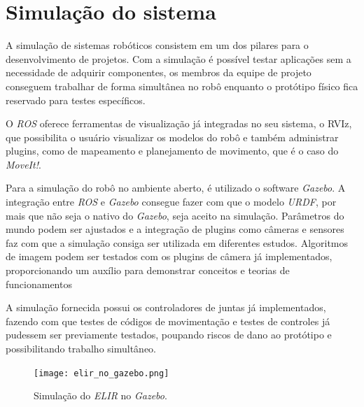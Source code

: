 \section{Simulação do sistema}
\label{sec:sim}
A simulação de sistemas robóticos consistem em um dos pilares para o desenvolvimento de projetos. Com a simulação é possível testar aplicações sem a necessidade de adquirir componentes, os membros da equipe de projeto conseguem trabalhar de forma simultânea no robô enquanto o protótipo físico fica reservado para testes específicos.

O \textit{ROS} oferece ferramentas de visualização já integradas no seu sistema, o RVIz, que possibilita o usuário visualizar os modelos do robô e também administrar plugins, como de mapeamento e planejamento de movimento, que é o caso do \textit{MoveIt!}.



Para a simulação do robô no ambiente aberto, é utilizado  o software \textit{Gazebo}. A integração entre \textit{ROS} e \textit{Gazebo} consegue fazer com que o modelo \textit{URDF}, por mais que não seja o nativo do \textit{Gazebo}, seja aceito na simulação. Parâmetros do mundo podem ser ajustados e a integração de plugins como câmeras e sensores faz com que a simulação consiga ser utilizada em diferentes estudos. Algoritmos de imagem podem ser testados com os plugins de câmera já implementados, proporcionando um auxílio para demonstrar conceitos e teorias de funcionamentos

A simulação fornecida possui os controladores de juntas já implementados, fazendo com que testes de códigos de movimentação e testes de controles já pudessem ser previamente testados, poupando riscos de dano ao protótipo e possibilitando trabalho simultâneo.

\begin{figure}[h!]												
	\centering												
	\texttt{[image: elir\_no\_gazebo.png]}				
	\caption{Simulação do \textit{ELIR} no \textit{Gazebo}.}		
	\label{img:gazebo1}									
\end{figure}

